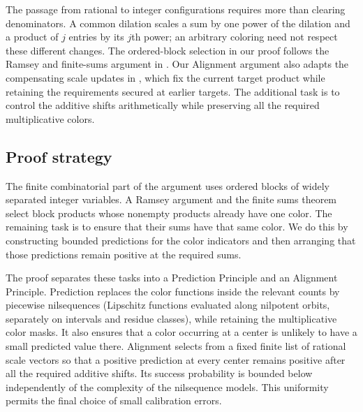 The passage from rational to integer configurations requires more than
clearing denominators. A common dilation scales a sum by one power of
the dilation and a product of $j$ entries by its $j$th power; an
arbitrary coloring need not respect these different changes.
The ordered-block selection in our proof follows the Ramsey and
finite-sums argument in \cite[Section~5]{Alweiss}.
Our Alignment argument also adapts the compensating scale updates in
\cite[Section~4]{Alweiss}, which fix the current target product while
retaining the requirements secured at earlier targets.
The additional task is to control the additive shifts arithmetically
while preserving all the required multiplicative colors.

\subsection{Proof strategy}

The finite combinatorial part of the argument uses ordered blocks of
widely separated integer variables. A Ramsey argument and the finite
sums theorem select block products whose nonempty products already
have one color. The remaining task is to ensure that their sums have
that same color. We do this by constructing bounded predictions for
the color indicators and then arranging that those predictions remain
positive at the required sums.

The proof separates these tasks into a Prediction Principle and an
Alignment Principle. Prediction replaces the color functions inside
the relevant counts by piecewise nilsequences (Lipschitz functions
evaluated along nilpotent orbits, separately on intervals and residue
classes), while retaining the multiplicative color masks.
It also ensures that a color occurring at
a center is unlikely to have a small predicted value there. Alignment
selects from a fixed finite list of rational scale vectors so that a
positive prediction at every center remains positive after all the
required additive shifts. Its success probability is bounded below
independently of the complexity of the nilsequence models. This
uniformity permits the final choice of small calibration errors.

